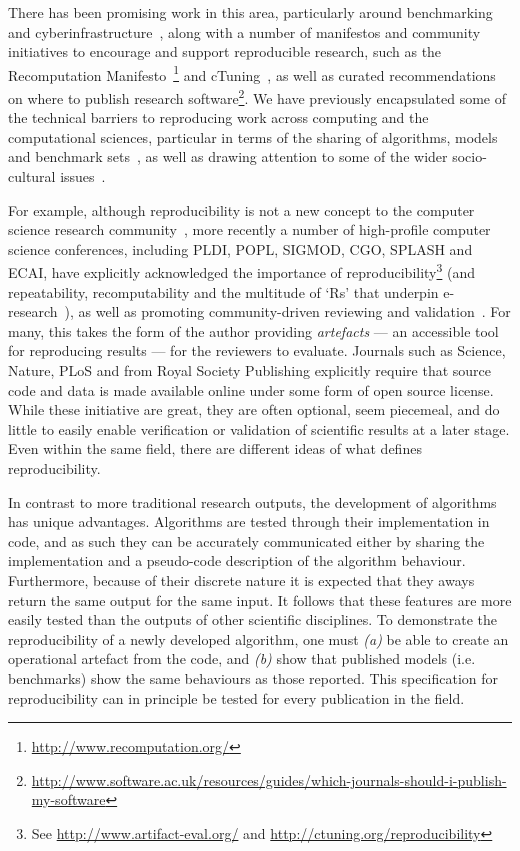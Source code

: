 \documentclass[conference]{IEEEtran}
\begin{document}
There has been promising work in this area, particularly around
benchmarking and
cyberinfrastructure~\cite{sim-et-al:2003,chirigati-et-al:2013,stodden+miguez:2014,stodden-et-al:2015},
along with a number of manifestos and community initiatives to
encourage and support reproducible research, such as the Recomputation
Manifesto~\cite{gent:2013}\footnote{\url{http://www.recomputation.org/}}
and cTuning~\cite{fursin-et-al:2014}, as well as curated
recommendations on where to publish research
software\footnote{\url{http://www.software.ac.uk/resources/guides/which-journals-should-i-publish-my-software}}. We
have previously encapsulated some of the technical barriers to
reproducing work across computing and the computational sciences,
particular in terms of the sharing of algorithms, models and benchmark
sets~\cite{crick-et-al_wssspe2,crick-et-al_recomp2014,crick-et-al:2015},
as well as drawing attention to some of the wider socio-cultural
issues~\cite{chuehong-et-al:2015}.

For example, although reproducibility is not a new concept to the
computer science research community~\cite{price:1986}, more recently a
number of high-profile computer science conferences, including PLDI,
POPL, SIGMOD, CGO, SPLASH and ECAI, have explicitly acknowledged the
importance of reproducibility\footnote{See
\url{http://www.artifact-eval.org/} and
\url{http://ctuning.org/reproducibility}} (and repeatability,
recomputability and the multitude of `Rs' that underpin
e-research~\cite{deroure:2010,feitelson:2015}), as well as promoting
community-driven reviewing and validation~\cite{fursin+dubach:2014}.
For many, this takes the form of the author providing \emph{artefacts}
--- an accessible tool for reproducing results --- for the reviewers
to evaluate. Journals such as Science, Nature, PLoS and from Royal
Society Publishing explicitly require that source code and data is
made available online under some form of open source license. While
these initiative are great, they are often optional, seem piecemeal,
and do little to easily enable verification or validation of
scientific results at a later stage. Even within the same field, there
are different ideas of what defines reproducibility.

In contrast to more traditional research outputs, the development of
algorithms has unique advantages. Algorithms are tested through their
implementation in code, and as such they can be accurately
communicated either by sharing the implementation and a pseudo-code
description of the algorithm behaviour. Furthermore, because of their
discrete nature it is expected that they aways return the same output
for the same input. It follows that these features are more easily
tested than the outputs of other scientific disciplines. To
demonstrate the reproducibility of a newly developed algorithm, one
must {\emph{(a)}} be able to create an operational artefact from the
code, and {\emph{(b)}} show that published models (i.e. benchmarks)
show the same behaviours as those reported. This specification for
reproducibility can in principle be tested for every publication in
the field.
\end{document}
